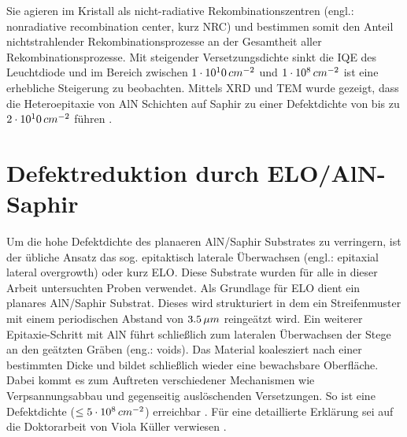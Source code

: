 \raggedright
%
Sie agieren im Kristall als nicht-radiative Rekombinationszentren (engl.: nonradiative recombination center, kurz NRC) und bestimmen somit den Anteil nichtstrahlender Rekombinationsprozesse an der Gesamtheit aller Rekombinationsprozesse. Mit steigender Versetzungsdichte sinkt die IQE des Leuchtdiode und im Bereich zwischen $1\cdot 10^10 \thinspace cm^{-2}$ und $1\cdot 10^8 \thinspace cm^{-2}$ ist eine erhebliche Steigerung zu beobachten. Mittels XRD und TEM wurde gezeigt, dass die Heteroepitaxie von AlN Schichten auf Saphir zu einer Defektdichte von bis zu $2\cdot 10^10 \thinspace cm^{-2}$ führen \cite{zeimeru}.

\section{Defektreduktion durch ELO/AlN-Saphir}

Um die hohe Defektdichte des planaeren AlN/Saphir Substrates zu verringern, ist der übliche Ansatz das sog. epitaktisch laterale Überwachsen (engl.: epitaxial lateral overgrowth) oder kurz ELO. Diese Substrate wurden für alle in dieser Arbeit untersuchten Proben verwendet. 
Als Grundlage für ELO dient ein planares AlN/Saphir Substrat. Dieses wird strukturiert in dem ein Streifenmuster mit einem periodischen Abstand von $3.5 \thinspace \mu m$ reingeätzt wird. Ein weiterer Epitaxie-Schritt mit AlN führt schließlich zum lateralen Überwachsen der Stege an den geätzten Gräben (eng.: voids).
Das Material koalesziert nach einer bestimmten Dicke und bildet schließlich wieder eine bewachsbare Oberfläche. Dabei kommt es zum Auftreten verschiedener Mechanismen wie Verpsannungsabbau und gegenseitig auslöschenden Versetzungen. So ist eine Defektdichte ($\leq 5 \cdot 10^8 \thinspace cm^{-2}$) erreichbar \cite{zeimeru} \cite{MOGILATENKO2014222} \cite{vkueller} \cite{IMURA2007257}. Für eine detaillierte Erklärung sei auf die Doktorarbeit von Viola Küller verwiesen \cite{vkueller}.
